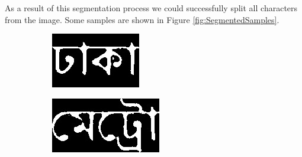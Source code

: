 \documentclass{standalone}
\begin{document}
As a result of this segmentation process we could successfully split all characters from the image. Some samples are shown in Figure \ref{fig:SegmentedSamples}.

\begin{figure}
\centering
\begin{subfigure}{0.40\textwidth}
  \centering
  \includegraphics[width=0.8\linewidth]{./img/sample/stage13-1}
\end{subfigure}
\begin{subfigure}{0.40\textwidth}
  \centering
  \includegraphics[width=0.8\linewidth]{./img/sample/stage13-2}
\end{subfigure}
\begin{subfigure}{0.15\textwidth}
  \centering

\end{subfigure}
\end{figure}
\end{document}
